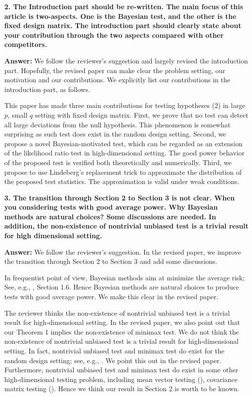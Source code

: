 \documentclass[11pt]{article}
\theoremstyle{plain}
\theoremstyle{definition}
\theoremstyle{remark}
\begin{document}
\textbf{
    2. The Introduction part should be re-written.
    The main focus of this article is two-aspects.
    One is the Bayesian test, and the other is the fixed design matrix. 
    The introduction part should clearly state about your contribution through the two aspects compared with other competitors.
}

\textbf{Answer:}
We follow the reviewer's suggestion and largely revised the introduction part.
Hopefully, the revised paper can make clear the problem setting, our motivation and our contributions.
We explicitly list our contributions in the introduction part, as follows.

\begin{adjustwidth}{3em}{3em}
    This paper has made three main contributions for testing hypotheses (2) in large $p$, small $q$ setting with fixed design matrix.
First, we prove that no test can detect all large deviations from the null       hypothesis.
This phenomenon is somewhat surprising as such test does exist in the random     design setting.
Second, we propose a novel Bayesian-motivated test, which can be regarded as an  extension of the likelihood ratio test in high-dimensional setting.
The good power behavior of the proposed test is verified both theoretically and  numerically.
Third, we propose to use Lindeberg's replacement trick to approximate the        distribution of the proposed test statistics.
The approximation is valid under weak conditions.
\end{adjustwidth}



\textbf{
    3. The transition through Section 2 to Section 3 is not clear.
    When you considering tests with good average power.
    Why Bayesian methods are natural choices?
    Some discussions are needed. In addition, the non-existence of nontrivial unbiased test is a trivial result for high dimensional setting.
}

\textbf{Answer:}
We follow the reviewer's suggestion.
In the revised paper,  we improve the transition through Section 2 to Section 3 and add some discussions.

In frequentist point of view, Bayesian methods aim at minimize the average risk;
See, e.g., \cite{Lehmann}, Section 1.6.
Hence Bayesian methods are natural choices to produce tests with good average power.
We make this clear in the revised paper.

The reviewer thinks the non-existence of nontrivial unbiased test is a trivial result for high-dimensional setting.
In the revised paper, we also point out that our Theorem 1 implies the non-existence of minimax test.
We do not think the non-existence of nontrivial unbiased test is a trivial result for high-dimensional setting.
In fact, nontrivial unbiased test and minimax test do exist for the random design setting; see, e.g., \cite{Ingster2010}.
We point this out in the revised paper.
Furthermore, nontrivial unbiased test and minimax test do exist in some other high-dimensional testing problem, including mean vector testing (\cite{Tony2013}), covariance matrix testing (\cite{Cai2013Optimal}).
Hence we think our result in Section 2 is worth to be known.
\end{document}
